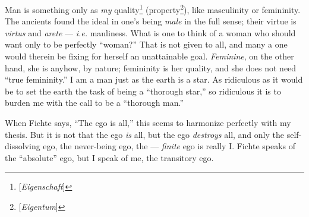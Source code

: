 Man is something only as \textit{my} quality\footnote{[\textit{Eigenschaft}]} 
(property\footnote{[\textit{Eigentum}]}), like masculinity or femininity. The 
ancients found the ideal in one's being \textit{male} in the full sense; their 
virtue is \textit{virtus} and \textit{arete} --- \textit{i.e.} manliness. What 
is one to think of a woman who should want only to be perfectly ``woman?'' 
That is not given to all, and many a one would therein be fixing for herself 
an unattainable goal. \textit{Feminine}, on the other hand, she is anyhow, by 
nature; femininity is her quality, and she does not need ``true 
femininity.'' I am a man just as the earth is a star. As ridiculous as it 
would be to set the earth the task of being a ``thorough star,'' so 
ridiculous it is to burden me with the call to be a ``thorough man.''

When Fichte says, ``The ego is all,'' this seems to harmonize perfectly with 
my thesis. But it is not that the ego \textit{is} all, but the ego 
\textit{destroys} all, and only the self-dissolving ego, the never-being ego, 
the --- \textit{finite} ego is really I. Fichte speaks of the ``absolute'' 
ego, but I speak of me, the transitory ego.

